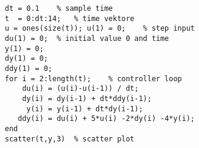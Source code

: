 \documentclass[../main.tex]{subfiles}
\begin{document}
\begin{lstlisting}[style=Matlab]
dt = 0.1    % sample time
t  = 0:dt:14;   % time vektore
u = ones(size(t)); u(1) = 0;    % step input
du(1) = 0;  % initial value 0 and time 
y(1) = 0; 
dy(1) = 0; 
ddy(1) = 0;
for i = 2:length(t);    % controller loop
    du(i) = (u(i)-u(i-1)) / dt;
    dy(i) = dy(i-1) + dt*ddy(i-1);
     y(i) = y(i-1) + dt*dy(i-1);
   ddy(i) = du(i) + 5*u(i) -2*dy(i) -4*y(i);   
end
scatter(t,y,3)  % scatter plot
\end{lstlisting}
\end{document}
